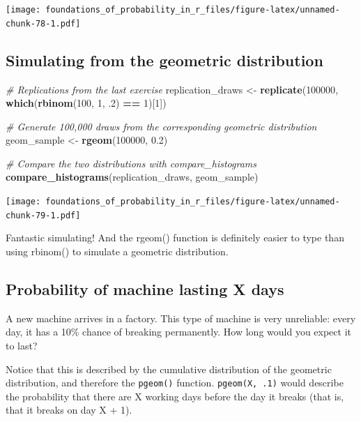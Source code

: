 \documentclass[]{article}
\newenvironment{Shaded}{\begin{snugshade}}{\end{snugshade}}
\newcommand{\CommentTok}[1]{\textcolor[rgb]{0.56,0.35,0.01}{\textit{#1}}}
\newcommand{\DecValTok}[1]{\textcolor[rgb]{0.00,0.00,0.81}{#1}}
\newcommand{\FloatTok}[1]{\textcolor[rgb]{0.00,0.00,0.81}{#1}}
\newcommand{\KeywordTok}[1]{\textcolor[rgb]{0.13,0.29,0.53}{\textbf{#1}}}
\newcommand{\NormalTok}[1]{#1}
\newcommand{\OperatorTok}[1]{\textcolor[rgb]{0.81,0.36,0.00}{\textbf{#1}}}
\newcommand{\StringTok}[1]{\textcolor[rgb]{0.31,0.60,0.02}{#1}}
\begin{document}
\texttt{[image: foundations\_of\_probability\_in\_r\_files/figure-latex/unnamed-chunk-78-1.pdf]}

\hypertarget{simulating-from-the-geometric-distribution}{%
\subsection{Simulating from the geometric
distribution}\label{simulating-from-the-geometric-distribution}}

\begin{Shaded}
\begin{Highlighting}[]
\CommentTok{# Replications from the last exercise}
\NormalTok{replication_draws <-}\StringTok{ }\KeywordTok{replicate}\NormalTok{(}\DecValTok{100000}\NormalTok{, }\KeywordTok{which}\NormalTok{(}\KeywordTok{rbinom}\NormalTok{(}\DecValTok{100}\NormalTok{, }\DecValTok{1}\NormalTok{, }\FloatTok{.2}\NormalTok{) }\OperatorTok{==}\StringTok{ }\DecValTok{1}\NormalTok{)[}\DecValTok{1}\NormalTok{])}

\CommentTok{# Generate 100,000 draws from the corresponding geometric distribution}
\NormalTok{geom_sample <-}\StringTok{ }\KeywordTok{rgeom}\NormalTok{(}\DecValTok{100000}\NormalTok{, }\FloatTok{0.2}\NormalTok{)}

\CommentTok{# Compare the two distributions with compare_histograms}
\KeywordTok{compare_histograms}\NormalTok{(replication_draws, geom_sample)}
\end{Highlighting}
\end{Shaded}

\texttt{[image: foundations\_of\_probability\_in\_r\_files/figure-latex/unnamed-chunk-79-1.pdf]}

Fantastic simulating! And the rgeom() function is definitely easier to
type than using rbinom() to simulate a geometric distribution.

\hypertarget{probability-of-machine-lasting-x-days}{%
\subsection{Probability of machine lasting X
days}\label{probability-of-machine-lasting-x-days}}

A new machine arrives in a factory. This type of machine is very
unreliable: every day, it has a 10\% chance of breaking permanently. How
long would you expect it to last?

Notice that this is described by the cumulative distribution of the
geometric distribution, and therefore the \texttt{pgeom()} function.
\texttt{pgeom(X,\ .1)} would describe the probability that there are X
working days before the day it breaks (that is, that it breaks on day X
+ 1).
\end{document}
